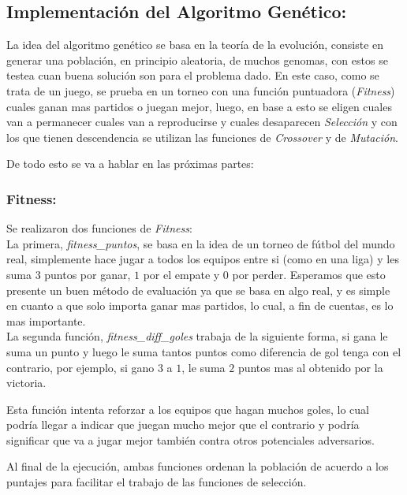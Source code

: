 \subsection{Implementación del Algoritmo Genético:}

La idea del algoritmo genético se basa en la teoría de la evolución, consiste en generar una población,
en principio aleatoria, de muchos genomas, con estos se testea cuan buena solución son para el problema dado.
En este caso, como se trata de un juego, se prueba en un torneo con una función puntuadora
(\emph{Fitness}) cuales ganan mas partidos o juegan mejor, luego, en base a esto se eligen cuales van a permanecer
cuales van a reproducirse y cuales desaparecen \emph{Selección} y con los que tienen descendencia se utilizan
las funciones de \emph{Crossover} y de \emph{Mutación}.

De todo esto se va a hablar en las próximas partes:

\subsubsection{Fitness:}

Se realizaron dos funciones de \emph{Fitness}:\\


La primera, \emph{fitness\_puntos}, se basa en la idea de un torneo de fútbol del mundo real, simplemente hace jugar a todos
los equipos entre si (como en una liga) y les suma $3$ puntos por ganar, $1$ por el empate y $0$ por perder.
Esperamos que esto presente un buen método de evaluación ya que se basa en algo real, y es simple en cuanto a que solo importa ganar
mas partidos, lo cual, a fin de cuentas, es lo mas importante.\\

La segunda función, \emph{fitness\_diff\_goles} trabaja de la siguiente forma, si gana le suma un punto y luego le suma tantos
puntos como diferencia de gol tenga con el contrario, por ejemplo, si gano $3$ a $1$, le suma $2$ puntos mas al obtenido por
la victoria.

Esta función intenta reforzar a los equipos que hagan muchos goles, lo cual podría llegar a indicar que juegan mucho mejor que el
contrario y podría significar que va a jugar mejor también contra otros potenciales adversarios.


Al final de la ejecución, ambas funciones ordenan la población de acuerdo a los puntajes para facilitar el trabajo de las funciones
de selección.



